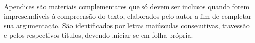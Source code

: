 
\begin{apendicesenv}

\begin{KeepFromToc}
\partapendices*
\end{KeepFromToc}

Apendices são materiais complementares que só devem ser inclusos quando forem imprescindíveis à compreensão do texto, elaborados pelo autor a fim de completar sua argumentação. São identificados por letras maiúsculas consecutivas, travessão e pelos respectivos títulos, devendo iniciar-se em folha própria.

\end{apendicesenv}
